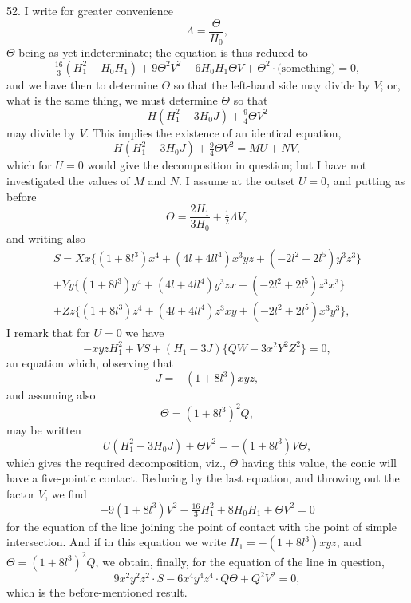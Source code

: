 \documentclass[11pt,a4paper]{article}
\theoremstyle{definition}
\begin{document}
52. I write for greater convenience
\[
\Lambda=\frac{\Theta}{H_0},
\]
$\Theta$ being as yet indeterminate; the equation is thus reduced to
\[
\tfrac{16}{3}(H_1^2-H_0H_1)+9\Theta^2V^2-6H_0H_1\Theta V+\Theta^2\cdot\text{(something)}=0,
\]
and we have then to determine $\Theta$ so that the left-hand side may divide by $V$; or, what is the same thing, we must determine $\Theta$ so that
\[
H(H_1^2-3H_0J)+\tfrac{9}{4}\Theta V^2
\]
may divide by $V$. This implies the existence of an identical equation,
\[
H(H_1^2-3H_0J)+\tfrac{9}{4}\Theta V^2=MU+NV,
\]
which for $U=0$ would give the decomposition in question; but I have not investigated the values of $M$ and $N$. I assume at the outset $U=0$, and putting as before
\[
\Theta=\frac{2H_1}{3H_0}+\tfrac{1}{2}\Lambda V,
\]
and writing also
\begin{multline*}
S=Xx\{(1+8l^3)x^4+(4l+4ll^4)x^3yz+(-2l^2+2l^5)y^3z^3\}\\
+Yy\{(1+8l^3)y^4+(4l+4ll^4)y^3zx+(-2l^2+2l^5)z^3x^3\}\\
+Zz\{(1+8l^3)z^4+(4l+4ll^4)z^3xy+(-2l^2+2l^5)x^3y^3\},
\end{multline*}
I remark that for $U=0$ we have
\[
-xyzH_1^2+VS+(H_1-3J)\{QW-3x^2Y^2Z^2\}=0,
\]
an equation which, observing that
\[
J=-(1+8l^3)xyz,
\]
and assuming also
\[
\Theta=(1+8l^3)^2Q,
\]
may be written
\[
U(H_1^2-3H_0J)+\Theta V^2=-(1+8l^3)V\Theta,
\]
which gives the required decomposition, viz., $\Theta$ having this value, the conic will have a five-pointic contact. Reducing by the last equation, and throwing out the factor $V$, we find
\[
-9(1+8l^3)V^2-\tfrac{16}{3}H_1^2+8H_0H_1+\Theta V^2=0
\]
for the equation of the line joining the point of contact with the point of simple intersection. And if in this equation we write $H_1=-(1+8l^3)xyz$, and $\Theta=(1+8l^3)^2Q$, we obtain, finally, for the equation of the line in question,
\[
9x^2y^2z^2\cdot S-6x^4y^4z^4\cdot Q\Theta+Q^2V^2=0,
\]
which is the before-mentioned result.
\end{document}
